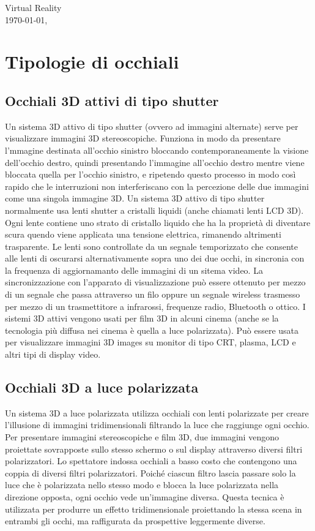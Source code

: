 \documentclass[8pt]{extarticle}
\begin{document}
\begin{multicols}{3}
\noindent
\large Virtual Reality
\normalsize \\
\today, \currenttime

\section{Tipologie di occhiali}
\subsection{Occhiali 3D attivi di tipo shutter}
Un sistema 3D attivo di tipo shutter (ovvero ad immagini alternate) serve per visualizzare immagini 3D stereoscopiche. Funziona in modo da presentare l'mmagine destinata all'occhio sinistro bloccando contemporaneamente la visione dell'occhio destro, quindi presentando l'immagine all'occhio destro mentre viene bloccata quella per l'occhio sinistro, e ripetendo questo processo in modo così rapido che le interruzioni non interferiscano con la percezione delle due immagini come una singola immagine 3D. Un sistema 3D attivo di tipo shutter normalmente usa lenti shutter a cristalli liquidi (anche chiamati lenti LCD 3D). Ogni lente contiene uno strato di cristallo liquido che ha la proprietà di diventare scura quendo viene applicata una tensione elettrica, rimanendo altrimenti trasparente. Le lenti sono controllate da un segnale temporizzato che consente alle lenti di oscurarsi alternativamente sopra uno dei due occhi, in sincronia con la frequenza di aggiornamanto delle immagini di un sitema video. La sincronizzazione con l'apparato di visualizzazione può essere ottenuto per mezzo di un segnale che passa attraverso un filo oppure un segnale wireless trasmesso per mezzo di un trasmettitore a infrarossi, frequenze radio, Bluetooth o ottico. I sistemi 3D attivi vengono usati per film 3D in alcuni cinema (anche se la tecnologia più diffusa nei cinema è quella a luce polarizzata). Può essere usata per visualizzare immagini 3D images su monitor di tipo CRT, plasma, LCD e altri tipi di display video.
\subsection{Occhiali 3D a luce polarizzata}
Un sistema 3D a luce polarizzata utilizza occhiali con lenti polarizzate per creare l'illusione di immagini tridimensionali filtrando la luce che raggiunge ogni occhio. Per presentare immagini stereoscopiche e film 3D, due immagini vengono proiettate sovrapposte sullo stesso schermo o sul display attraverso diversi filtri polarizzatori. Lo spettatore indossa occhiali a basso costo che contengono una coppia di diversi filtri polarizzatori. Poiché ciascun filtro lascia passare solo la luce che è polarizzata nello stesso modo e blocca la luce polarizzata nella direzione opposta, ogni occhio vede un'immagine diversa. Questa tecnica è utilizzata per produrre un effetto tridimensionale proiettando la stessa scena in entrambi gli occhi, ma raffigurata da prospettive leggermente diverse.

\end{multicols}
\end{document}
